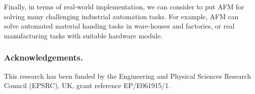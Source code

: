 \documentclass[smallcondensed]{svjour3}
\begin{document}
Finally, in terms of real-world implementation, we can consider to put AFM for solving many challenging industrial automation tasks. For example, AFM can solve automated material handing tasks in ware-houses and factories, or real manufacturing tasks with suitable hardware module. %
\subsubsection*{Acknowledgements. } 
This research has been funded by the Engineering and Physical Sciences Research Council (EPSRC), UK, grant reference EP/E061915/1.
 
%
%
%            
%
\end{document}
